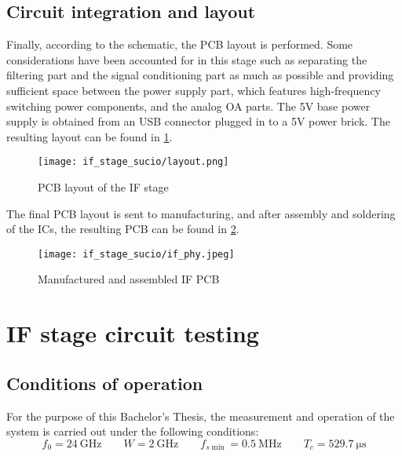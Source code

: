 \subsection{Circuit integration and layout}
Finally, according to the schematic, the PCB layout is performed. Some considerations have been accounted for in this stage such as separating the filtering part and the signal conditioning part as much as possible and providing sufficient space between the power supply part, which features high-frequency switching power components, and the analog OA parts. The 5V base power supply is obtained from an USB connector plugged in to a 5V power brick. The resulting layout can be found in \cref{fig:if_layout}.

\begin{figure}[h]
	\centering
	\texttt{[image: if\_stage\_sucio/layout.png]}
	\caption{PCB layout of the IF stage}
	\label{fig:if_layout}
\end{figure}

The final PCB layout is sent to manufacturing, and after assembly and soldering of the ICs, the resulting PCB can be found in \cref{fig:if_phy}.

\begin{figure}[h]
	\centering
	\texttt{[image: if\_stage\_sucio/if\_phy.jpeg]}
	\caption{Manufactured and assembled IF PCB}
	\label{fig:if_phy}
\end{figure}

\section{IF stage circuit testing}



\subsection{Conditions of operation}
For the purpose of this Bachelor's Thesis, the measurement and operation of the system is carried out under the following conditions:
\begin{equation} \label{eq:if_conditions}
	f_0 = \SI{24}{\giga\hertz} \qquad W = \SI{2}{\giga\hertz} \qquad f_{s\min} = \SI{0.5}{\mega\hertz} \qquad T_c = \SI{529.7}{\micro\second}
\end{equation}

